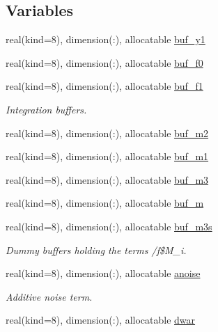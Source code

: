 \subsection*{Variables}
\begin{DoxyCompactItemize}
\item 
real(kind=8), dimension(\+:), allocatable \hyperlink{namespacerk2__wl__integrator_aa99c24f0aa8ae7eacd3d5123ea70db7b}{buf\+\_\+y1}
\item 
real(kind=8), dimension(\+:), allocatable \hyperlink{namespacerk2__wl__integrator_a1bd3729b5251a62db77c2821d8570527}{buf\+\_\+f0}
\item 
real(kind=8), dimension(\+:), allocatable \hyperlink{namespacerk2__wl__integrator_a995936e8fb15609c95896f08b5e70a44}{buf\+\_\+f1}
\begin{DoxyCompactList}\small\item\em Integration buffers. \end{DoxyCompactList}\item 
real(kind=8), dimension(\+:), allocatable \hyperlink{namespacerk2__wl__integrator_a86ad58f3281d4e047c2db27060d98d2f}{buf\+\_\+m2}
\item 
real(kind=8), dimension(\+:), allocatable \hyperlink{namespacerk2__wl__integrator_a4be840fb90a95206b2740f5a0b31b83f}{buf\+\_\+m1}
\item 
real(kind=8), dimension(\+:), allocatable \hyperlink{namespacerk2__wl__integrator_a73553426581c0b8705341b6faf38cff1}{buf\+\_\+m3}
\item 
real(kind=8), dimension(\+:), allocatable \hyperlink{namespacerk2__wl__integrator_a744d43e9a769cad7dde659df50975e35}{buf\+\_\+m}
\item 
real(kind=8), dimension(\+:), allocatable \hyperlink{namespacerk2__wl__integrator_ac3e8a32ab8553b8c00d467a792bbf051}{buf\+\_\+m3s}
\begin{DoxyCompactList}\small\item\em Dummy buffers holding the terms /f\$\+M\+\_\+i. \end{DoxyCompactList}\item 
real(kind=8), dimension(\+:), allocatable \hyperlink{namespacerk2__wl__integrator_ab0045343086f8e55d6dd0579105aad6d}{anoise}
\begin{DoxyCompactList}\small\item\em Additive noise term. \end{DoxyCompactList}\item 
real(kind=8), dimension(\+:), allocatable \hyperlink{namespacerk2__wl__integrator_a44cee4402f05ef3465bf87baf91951e8}{dwar}

\end{DoxyCompactItemize}
